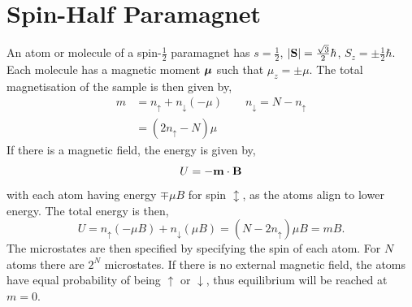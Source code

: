 \documentclass{book}
\begin{document}
\section{Spin-Half Paramagnet}
An atom or molecule of a spin-$\frac{1}{2}$ paramagnet has $s = \frac{1}{2}$, $\abs{\vb{S}} = \frac{\sqrt{3}}{2}\hbar$, $S_z = \pm \frac{1}{2}\hbar$. Each molecule has a magnetic moment $\vb*{\mu}$ such that $\mu_z = \pm \mu$. The total magnetisation of the sample is then given by,
\begin{equation}
	\begin{split}
		m & = n_{\uparrow} + n_{\downarrow}(-\mu) \hspace{2em} n_{\downarrow} = N - n_{\uparrow} \\
		& = (2n_{\uparrow} - N)\mu	\end{split}
\end{equation}
If there is a magnetic field, the energy is given by,
\begin{equation}
	 U = -\vb{m}\cdot\vb{B}
\end{equation}
with each atom having energy $\mp \mu B$ for spin $\updownarrow$, as the atoms align to lower energy. The total energy is then,
\begin{equation}
	U = n_{\uparrow}(-\mu B) + n_{\downarrow}(\mu B) = (N - 2n_{\uparrow})\mu B = mB.
\end{equation}
The microstates are then specified by specifying the spin of each atom. For $N$ atoms there are $2^N$ microstates. If there is no external magnetic field, the atoms have equal probability of being $\uparrow$ or $\downarrow$, thus equilibrium will be reached at $m=0$.
\end{document}
